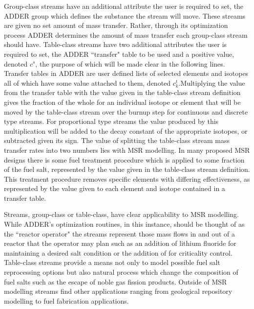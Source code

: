 \documentclass[]{elsarticle}
\begin{document}
Group-class streams have an additional attribute the user is required to set, 
the ADDER group which defines the substance the stream will move. These streams
are given no set amount of mass transfer. Rather, through its optimization 
process
ADDER determines the amount of mass transfer each group-class stream should
have. Table-class streams have two additional attributes the user is required to
set, the ADDER ``transfer" table to be used and a positive value, denoted
$c^{s}$, the purpose 
of which will be made clear in the following lines.
Transfer tables in ADDER are user defined lists of selected elements
and isotopes all of which have some value attached to them, denoted $c_{k}^{t}$.Multiplying the
value from the transfer table with the value given in the table-class stream
definition gives the fraction of the whole for an individual isotope or
element that will be moved by the table-class stream over the burnup step for
continuous and discrete type streams. For proportional type streams the value
produced by this multiplication will be added to the decay constant of the
appropriate isotopes, or subtracted given its sign. The value of splitting
the table-class stream mass transfer rates into two numbers lies with MSR
modelling. In many proposed MSR designs there is some fuel treatment procedure
which is applied to some fraction of the fuel salt, represented by the value
given in the table-class stream definition. This treatment procedure removes
specific elements with differing effectiveness, as represented by the value
given to each element and isotope contained in a transfer table.

Streams, group-class or table-class, have clear applicability to MSR modelling.
While ADDER's optimization routines, in this instance, should be thought of as
the ``reactor
operator" the streams represent those mass flows in and out of a reactor that
the operator may plan such as an addition of lithium fluoride for maintaining
a desired salt condition or the addition of  for criticality
control. Table-class streams provide a means not only to model possible
fuel salt reprocessing options but also natural process which change the
composition of fuel salts such as the escape of noble gas fission products. 
Outside of MSR modelling streams find other applications ranging from geological
repository modelling to fuel fabrication applications.
\end{document}
